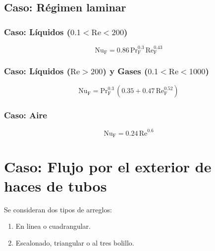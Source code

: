 \subsection{Caso: Régimen laminar}

\subsubsection{Caso: Líquidos ($0.1 < \text{Re} < 200$)}
\begin{equation}
    \text{Nu}_\text{F} = 0.86\,\text{Pr}_\text{F}^{0.3}\,
    \text{Re}_\text{F}^{0.43}
\end{equation}

\subsubsection{Caso: Líquidos ($\text{Re} > 200$) y
Gases ($0.1 < \text{Re} < 1000$)}
\begin{equation}
    \text{Nu}_\text{F} = \text{Pr}_\text{F}^{0.3}\,
    (0.35 + 0.47\,\text{Re}_\text{F}^{0.52})
\end{equation}

\subsubsection{Caso: Aire}
\begin{equation}
    \text{Nu}_\text{F} = 0.24\,\text{Re}^{0.6}
\end{equation}

\section{Caso: Flujo por el exterior de haces de tubos}
Se consideran dos tipos de arreglos:

\begin{enumerate}
    \item En linea o cuadrangular.
    \item Escalonado, triangular o al tres bolillo.
\end{enumerate}

